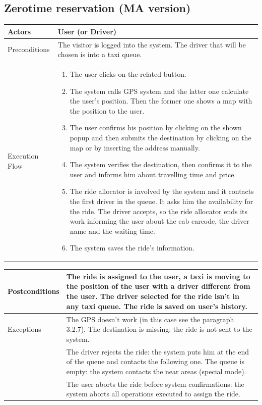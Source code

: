 \clearpage

\subsection{Zerotime reservation (MA version)}
\begin{tabular}{lp{8cm}}
	\hline 
	Actors & User (or Driver)  \\ \hline
	Preconditions & The visitor is logged into the system. The driver that will be chosen is into a taxi queue.  \\ \hline
	Execution Flow &  \begin{enumerate}
					\item The user clicks on the related button.
					\item The system calls GPS system and the latter one calculate the user's position. Then the former one shows a map with the position to the user.
					\item The user confirms his position by clicking on the shown popup and then submits the destination by clicking on the map or by inserting the address manually.
					\item The system verifies the destination, then confirms it to the user and informs him about travelling time and price.
					\item The ride allocator is involved by the system and it contacts the first driver in the queue. It asks him the availability for the ride. The driver accepts, so the ride allocator ends its work informing the user about the cab carcode, the driver name and the waiting time.
					\item The system saves the ride's information.
				\end{enumerate}
\\ \hline
\end{tabular}
\newpage
\begin{tabular}{lp{8cm}}
	\hline	 
	 Postconditions & The ride is assigned to the user, a taxi is moving to the position of the user with a driver different from the user. The driver selected for the ride isn't in any taxi queue. The ride is saved on user's history. \\ \hline
	 Exceptions &  The GPS doesn't work (in this case see the paragraph 3.2.7). The destination is missing: the ride is not sent to the system.\\
	 &
The driver rejects the ride: the system puts him at the end of the queue and contacts the following one. The queue is empty: the system contacts the near areas (special mode).\\
&
The user aborts the ride before system confirmations: the system aborts all operations executed to assign the ride.\\ \hline
\end{tabular}

